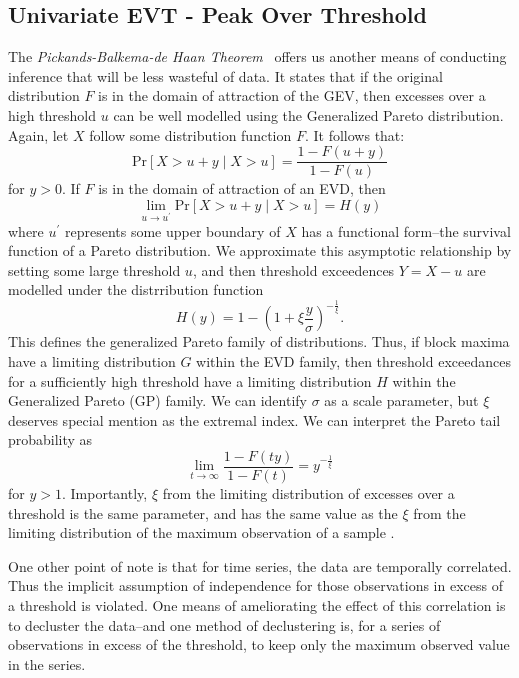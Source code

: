 \subsection{Univariate EVT - Peak Over Threshold}
\label{subsec:univevtpot}
The \emph{Pickands-Balkema-de Haan Theorem}~\citep{balkema1974,pickands1975} offers us another means
  of conducting inference that will be less wasteful of data.  It states that if the original distribution
  $F$ is in the domain of attraction of the GEV, then excesses over a high threshold $u$ can be well
  modelled using the Generalized Pareto distribution.  Again, let $X$ follow some distribution function
  $F$. It follows that:
  \begin{equation*}
    \text{Pr}\left[X > u + y\mid X > u\right] = \frac{1 - F(u + y)}{1 - F(u)}
  \end{equation*}
  for $y > 0$.  If $F$ is in the domain of attraction of an EVD, then
  \begin{equation*}
    \lim\limits_{u\to u^{\prime}}\text{Pr}\left[X > u + y\mid X > u\right] = H(y)
  \end{equation*}
  where $u^{\prime}$ represents some upper boundary of $X$ has a functional form--the survival
  function of a Pareto distribution. We approximate this asymptotic relationship by setting some
  large threshold $u$, and then threshold exceedences $Y = X - u$ are modelled under the distrribution
  function
  \begin{equation*}
    \label{eqn:gp}
    H(y) = 1 - \left(1 + \xi\frac{y}{\sigma}\right)^{-\frac{1}{\xi}}.
  \end{equation*}
  This defines the generalized Pareto family of distributions.  Thus, if block maxima have a
  limiting distribution $G$ within the EVD family, then threshold exceedances for a sufficiently
  high threshold have a limiting distribution $H$ within the Generalized Pareto (GP) family.  We can
  identify $\sigma$ as a scale parameter, but $\xi$ deserves special mention as the extremal index.
  We can interpret the Pareto tail probability as
  \begin{equation*}
    \lim\limits_{t\to\infty}\frac{1 - F(ty)}{1 - F(t)} = y^{-\frac{1}{\xi}}
  \end{equation*}
  for $y > 1$.  Importantly, $\xi$ from the limiting distribution of excesses over a threshold is the
  same parameter, and has the same value as the $\xi$ from the limiting distribution of the maximum
  observation of a sample \citep{dehaan2006}.

One other point of note is that for time series, the data are temporally correlated.  Thus the implicit
  assumption of independence for those observations in excess of a threshold is violated.  One means
  of ameliorating the effect of this correlation is to decluster the data--and one method of declustering
  is, for a series of observations in excess of the threshold, to keep only the maximum observed value
  in the series.

